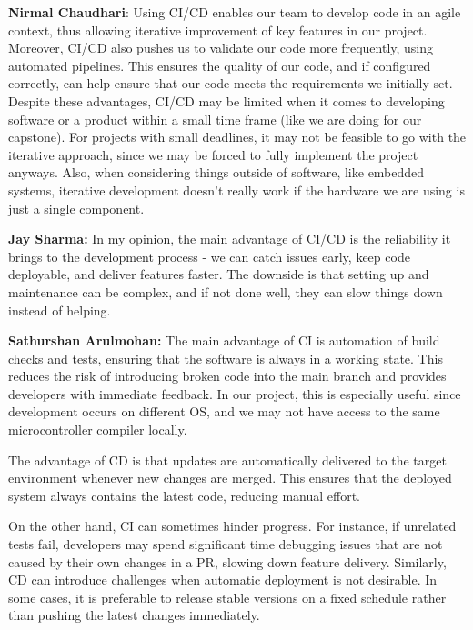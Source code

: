 \documentclass{article}
\begin{document}
\begin{enumerate}
    \textbf{Nirmal Chaudhari}: Using CI/CD enables our team to develop code in
    an agile context, thus allowing iterative improvement of key features in our
    project. Moreover, CI/CD also pushes us to validate our code more
    frequently, using automated pipelines. This ensures the quality of our code,
    and if configured correctly, can help ensure that our code meets the
    requirements we initially set. Despite these advantages, CI/CD may be
    limited when it comes to developing software or a product within a small
    time frame (like we are doing for our capstone). For projects with small
    deadlines, it may not be feasible to go with the iterative approach, since
    we may be forced to fully implement the project anyways. Also, when
    considering things outside of software, like embedded systems, iterative
    development doesn't really work if the hardware we are using is just a
    single component. 

    \textbf{Jay Sharma:} In my opinion, the main advantage of CI/CD is the
    reliability it brings to the development process - we can catch issues
    early, keep code deployable, and deliver features faster. The downside is
    that setting up and maintenance can be complex, and if not done well, they
    can slow things down instead of helping.
    
    \textbf{Sathurshan Arulmohan:} The main advantage of CI is automation of
    build checks and tests, ensuring that the software is always in a working
    state. This reduces the risk of introducing broken code into the main branch
    and provides developers with immediate feedback. In our project, this is
    especially useful since development occurs on different OS, and we may not
    have access to the same microcontroller compiler locally.

    The advantage of CD is that updates are automatically delivered to the
    target environment whenever new changes are merged. This ensures that the
    deployed system always contains the latest code, reducing manual effort.
    
    On the other hand, CI can sometimes hinder progress. For instance, if
    unrelated tests fail, developers may spend significant time debugging issues
    that are not caused by their own changes in a PR, slowing down feature
    delivery. Similarly, CD can introduce challenges when automatic deployment
    is not desirable. In some cases, it is preferable to release stable versions
    on a fixed schedule rather than pushing the latest changes immediately.


\end{enumerate}
\end{document}
